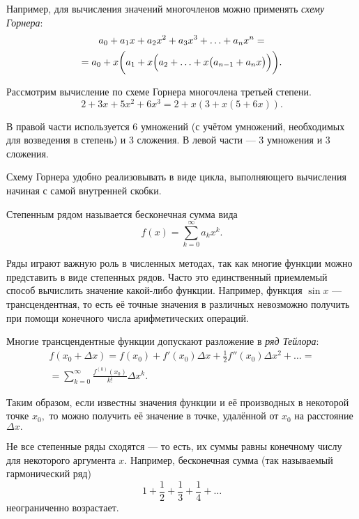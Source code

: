 
Например, для вычисления значений многочленов можно применять
\emph{схему Горнера}:
\begin{multline*}
  a_{0}+a_{1}x+a_{2}x^{2}+a_{3}x^{3}+\ldots+a_{n}x^{n}=\\
  =a_{0}+x\biggl(a_{1}+x\Bigl(a_{2}+\ldots+x\bigl(a_{n-1}+a_{n}x\bigr)\Bigr)\biggr).
\end{multline*}

\begin{example}
  Рассмотрим вычисление по схеме Горнера многочлена третьей степени.
  \[
  2+3x+5x^{2}+6x^{3}=2+x(3+x(5+6x)).
  \]

  В правой части используется 6 умножений (с учётом умножений,
  необходимых для возведения в степень) и 3 сложения. В левой части —
  3 умножения и 3 сложения.
\end{example}

Схему Горнера удобно реализовывать в виде цикла, выполняющего
вычисления начиная с самой внутренней скобки.


Степенным рядом называется бесконечная сумма вида
\[
f(x)=\sum_{k=0}^{\infty}a_{k}x^{k}.
\]

Ряды играют важную роль в численных методах, так как многие функции
можно представить в виде степенных рядов. Часто это единственный
приемлемый способ вычислить значение какой-либо функции. Например,
функция $\sin x$ — трансцендентная, то есть её точные значения в
различных невозможно получить при помощи конечного числа
арифметических операций.

Многие трансцендентные функции допускают разложение в \emph{ряд
  Тейлора}:
\begin{multline*}
  f(x_{0}+\Delta x)=f(x_{0})+f'(x_{0})\Delta
  x+\frac{1}{2}f''(x_{0})\Delta
  x^{2}+\ldots=\\ =\sum_{k=0}^{\infty}\frac{f^{(k)}(x_{0})}{k!}\Delta
  x^{k}.
\end{multline*}

Таким образом, если известны значения функции и её производных в
некоторой точке $x_{0},$ то можно получить её значение в точке,
удалённой от $x_{0}$ на расстояние $\Delta x.$


Не все степенные ряды сходятся — то есть, их суммы равны конечному
числу для некоторого аргумента $x$. Например, бесконечная сумма (так
называемый гармонический ряд)
\[
1+\frac{1}{2}+\frac{1}{3}+\frac{1}{4}+\dots
\]
неограниченно возрастает.


